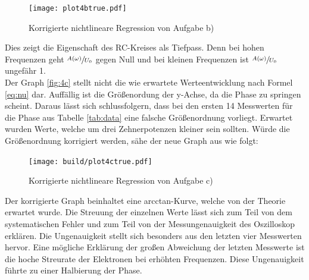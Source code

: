 
\begin{figure}[H]
    \texttt{[image: plot4btrue.pdf]}
    \centering
    \caption{Korrigierte nichtlineare Regression von Aufgabe b)}
    \label{fig:4btrue}
\end{figure}


Dies zeigt die Eigenschaft des RC-Kreises als Tiefpass.
Denn bei hohen Frequenzen geht $\sfrac{A(\omega)}{U_0}$ gegen Null und bei kleinen
Frequenzen ist $\sfrac{A(\omega)}{U_0}$ ungefähr 1.
\\





Der Graph \ref{fig:4c} stellt nicht die wie erwartete Werteentwicklung nach Formel
\eqref{eq:nu} dar. Auffällig ist die Größenordung der y-Achse, da die Phase zu
springen scheint. Daraus lässt sich schlussfolgern, dass bei den ersten 14 Messwerten
für die Phase aus Tabelle \ref{tab:data} eine falsche Größenordnung vorliegt.
Erwartet wurden Werte, welche um drei Zehnerpotenzen kleiner sein sollten. 
Würde die Größenordnung korrigiert werden, sähe der neue Graph aus wie folgt:

  \begin{figure}[H]
    \texttt{[image: build/plot4ctrue.pdf]}
    \centering
    \caption{Korrigierte nichtlineare Regression von Aufgabe c)}
    \label{fig:4ctrue}
  \end{figure}

Der korrigierte Graph beinhaltet eine arcctan-Kurve, welche von der Theorie 
erwartet wurde. Die Streuung der einzelnen Werte lässt sich zum Teil von dem 
systematischen Fehler und zum Teil von der Messungenauigkeit des Oszilloskop erklären.
Die Ungenauigkeit stellt sich besonders aus den letzten vier Messwerten hervor. 
Eine mögliche Erklärung der großen Abweichung der letzten Messwerte ist die hoche 
Streurate der Elektronen bei erhöhten Frequenzen. Diese Ungenauigkeit führte zu einer 
Halbierung der Phase. 



\newpage
\nocite{V353}
\nocite{scipy}
\nocite{uncertainties}
\printbibliography
